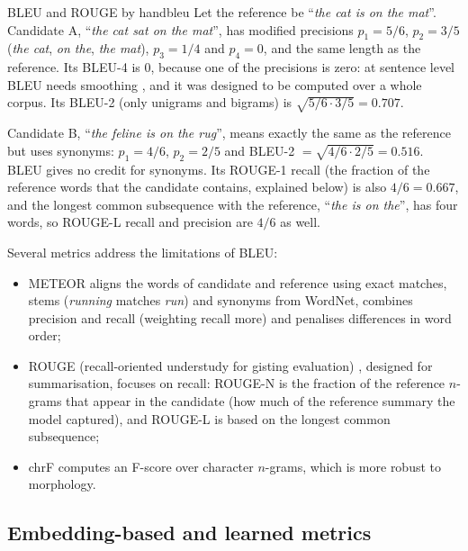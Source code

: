 \begin{example}{BLEU and ROUGE by hand}{bleu}
Let the reference be ``\emph{the cat is on the mat}''. Candidate A, ``\emph{the cat sat on the
mat}'', has modified precisions $p_1=5/6$, $p_2=3/5$ (\emph{the cat}, \emph{on the},
\emph{the mat}), $p_3=1/4$ and $p_4=0$, and the same length as the reference. Its BLEU-4 is 0,
because one of the precisions is zero: at sentence level BLEU needs smoothing
\citep{chen2014systematic}, and it was designed to be computed over a whole corpus. Its BLEU-2
(only unigrams and bigrams) is $\sqrt{5/6\cdot3/5}=0.707$.

Candidate B, ``\emph{the feline is on the rug}'', means exactly the same as the reference but
uses synonyms: $p_1=4/6$, $p_2=2/5$ and BLEU-2 $=\sqrt{4/6\cdot2/5}=0.516$. BLEU gives no credit for synonyms. Its ROUGE-1 recall (the fraction of the reference words that the candidate contains, explained below) is also $4/6=0.667$, and the longest common subsequence
with the reference, ``\emph{the is on the}'', has four words, so ROUGE-L recall and precision
are $4/6$ as well.
\end{example}

Several metrics address the limitations of BLEU:
\begin{itemize}
  \item METEOR \citep{banerjee2005meteor} aligns the words of candidate and reference using
        exact matches, stems (\emph{running} matches \emph{run}) and synonyms from WordNet,
        combines precision and recall (weighting recall more) and penalises differences in word
        order;
  \item ROUGE (recall-oriented understudy for gisting evaluation) \citep{lin2004rouge}, designed for summarisation, focuses on recall: ROUGE-N is
        the fraction of the reference $n$-grams that appear in the candidate (how much of the
        reference summary the model captured), and ROUGE-L is based on the longest common
        subsequence;
  \item chrF \citep{popovic2015chrf} computes an F-score over character $n$-grams, which is
        more robust to morphology.
\end{itemize}

\subsection{Embedding-based and learned metrics}

